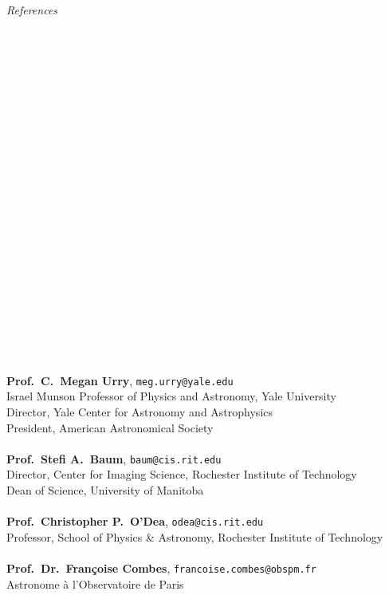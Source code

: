 \documentclass[11pt]{article}
\begin{document}
\vspace{4mm}



\hspace{2.5mm} \parbox{1.5in}{{\it References \\\\\\\\\\\\\\\\\\\\\\\\\\\\\\\\\\\\\\\\\\\\\\}} \parbox{5.15in}{
{\bf Prof.~C.~Megan Urry}, \texttt{meg.urry@yale.edu}\\
Israel Munson Professor of Physics and Astronomy, Yale University\\
Director, Yale Center for Astronomy and Astrophysics\\
President, American Astronomical Society\\ \\
{\bf Prof.~Stefi A.~Baum}, \texttt{baum@cis.rit.edu}\\
Director, Center for Imaging Science, Rochester Institute of Technology\\
Dean of Science, University of Manitoba\\ \\
{\bf Prof.~Christopher P.~O'Dea}, \texttt{odea@cis.rit.edu}\\
Professor, School of Physics \& Astronomy, Rochester Institute of Technology\\ \\
{\bf Prof.~Dr.~Fran\c coise Combes}, \texttt{francoise.combes@obspm.fr}\\
Astronome \`a l'Observatoire de Paris\\ \\
}
\end{document}
